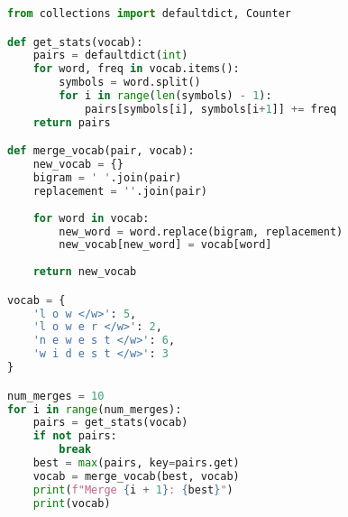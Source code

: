 \begin{lstlisting}[language=Python]
from collections import defaultdict, Counter

def get_stats(vocab):
    pairs = defaultdict(int)
    for word, freq in vocab.items():
        symbols = word.split()
        for i in range(len(symbols) - 1):
            pairs[symbols[i], symbols[i+1]] += freq
    return pairs

def merge_vocab(pair, vocab):
    new_vocab = {}
    bigram = ' '.join(pair)
    replacement = ''.join(pair)
    
    for word in vocab:
        new_word = word.replace(bigram, replacement)
        new_vocab[new_word] = vocab[word]
    
    return new_vocab

vocab = {
    'l o w </w>': 5,
    'l o w e r </w>': 2,
    'n e w e s t </w>': 6,
    'w i d e s t </w>': 3
}

num_merges = 10
for i in range(num_merges):
    pairs = get_stats(vocab)
    if not pairs:
        break
    best = max(pairs, key=pairs.get)
    vocab = merge_vocab(best, vocab)
    print(f"Merge {i + 1}: {best}")
    print(vocab)    
\end{lstlisting}

\newpage